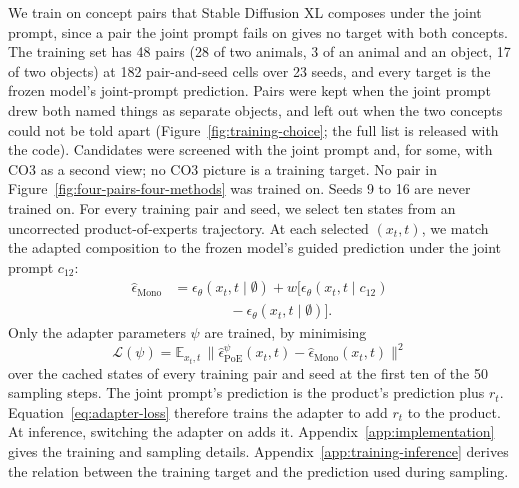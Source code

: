 \documentclass{article} %
\newcommand{\trainpairs}{48}
\newcommand{\statesperrun}{ten}
\begin{document}
We train on concept pairs that Stable Diffusion XL composes under the joint prompt, since a pair the joint prompt fails on gives no target with both concepts. The training set has \trainpairs{} pairs (28 of two animals, 3 of an animal and an object, 17 of two objects) at 182 pair-and-seed cells over 23 seeds, and every target is the frozen model's joint-prompt prediction. Pairs were kept when the joint prompt drew both named things as separate objects, and left out when the two concepts could not be told apart (Figure~\ref{fig:training-choice}; the full list is released with the code). Candidates were screened with the joint prompt and, for some, with CO3 \citep{dutta2026steer} as a second view; no CO3 picture is a training target. No pair in Figure~\ref{fig:four-pairs-four-methods} was trained on. Seeds 9 to 16 are never trained on.
For every training pair and seed, we select \statesperrun{} states
from an uncorrected product-of-experts trajectory. At each selected
$(x_t,t)$, we match the adapted composition to the frozen model's
guided prediction under the joint prompt $c_{12}$:
\begin{equation}
\begin{aligned}
\hat\epsilon_{\mathrm{Mono}}
&=
\epsilon_\theta(x_t,t\mid\emptyset)
+
w\bigl[
\epsilon_\theta(x_t,t\mid c_{12}) \\
&\qquad\qquad
-
\epsilon_\theta(x_t,t\mid\emptyset)
\bigr].
\end{aligned}
\label{eq:mono-target}
\end{equation}
Only the adapter parameters $\psi$ are trained, by minimising
\begin{equation}
\mathcal L(\psi)=\mathbb E_{x_t,t}\,\bigl\|\hat\epsilon^{\psi}_{\mathrm{PoE}}(x_t,t)-\hat\epsilon_{\mathrm{Mono}}(x_t,t)\bigr\|^2
\label{eq:adapter-loss}
\end{equation}
over the cached states of every training pair and seed at the first ten of the 50 sampling steps. The joint prompt's prediction is the product's prediction plus $r_t$. Equation~\ref{eq:adapter-loss} therefore trains the adapter to add $r_t$ to the product. At inference, switching the adapter on adds it.
Appendix~\ref{app:implementation} gives the training and sampling
details. Appendix~\ref{app:training-inference} derives the relation
between the training target and the prediction used during sampling.
\end{document}
